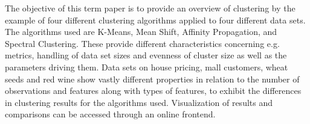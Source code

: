 The objective of this term paper is to provide an overview of clustering by the example of four different clustering algorithms applied to four different data sets. The algorithms used are K-Means, Mean Shift, Affinity Propagation, and Spectral Clustering. These provide different characteristics concerning e.g. metrics, handling of data set sizes and evenness of cluster size as well as the parameters driving them. Data sets on house pricing, mall customers, wheat seeds and red wine show vastly different properties in relation to the number of observations and features along with types of features, to exhibit the differences in clustering results for the algorithms used. Visualization of results and comparisons can be accessed through an online frontend.